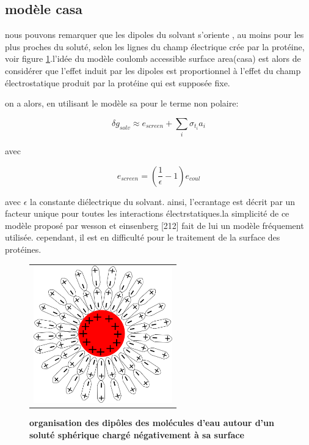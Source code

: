 \subsection{modèle casa}

nous pouvons remarquer que les dipoles du solvant s'oriente , au moins pour les plus proches du soluté, selon les lignes du champ électrique crée par la protéine, voir figure \ref{graph:ecrantage}.l'idée du modèle \og coulomb accessible surface area\fg (casa)  est alors de considérer que l'effet induit par les dipoles est proportionnel à l'effet du champ électrostatique produit par la protéine qui est supposée fixe. 

on a  alors, en utilisant le modèle sa pour le terme non polaire:

\begin{equation}
\delta g_{solv} \approx e_{screen} + \sum_i \sigma_{t_i} a_i
\end{equation}

avec 

\begin{equation}
e_{screen} =  (\frac{1}{\epsilon} -1 )e_{coul}
\end{equation}

avec $ \epsilon $ la constante diélectrique du solvant.
ainsi, l'ecrantage est décrit par un facteur unique pour toutes les interactions électrstatiques.la simplicité de ce modèle proposé par wesson et einsenberg [212] fait de lui un modèle fréquement utilisée. cependant, il est en difficulté pour le traitement de la surface des protéines.


   \begin{figure}[t]
     \centering
     \begin{tabular}{c}
       \includegraphics[width=6cm]{figure/ecrantage.png} &
     \end{tabular}
     
     \caption{\textbf{organisation des dipôles des molécules d'eau autour d'un soluté sphérique chargé négativement à sa surface}}
\label{graph:ecrantage}
   \end{figure}
   


